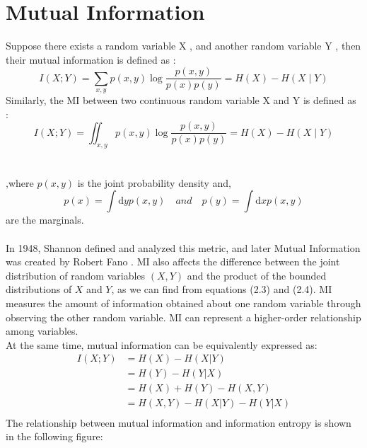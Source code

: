 \section{Mutual Information}
Suppose there exists a random variable X , and another random variable Y , then their mutual information is defined as : \cite{cover1999elements}
\begin{equation}
I(X;Y) = \sum_{x,y}p(x,y)\log{\frac{p(x,y)}{p(x)p(y)} }  = H(X) - H(X\mid Y)
\end{equation} 
Similarly, the MI between two continuous random variable X and Y is defined as : 
\begin{equation}
I(X;Y) = \iint_{x,y}p(x,y)\log{\frac{p(x,y)}{p(x)p(y)} } = H(X) - H(X\mid Y) 
\end{equation} 
\\ \hspace*{\fill} \\
,where $p(x,y)$ is the joint probability density and, 
\begin{equation}
p(x) = \int \mathrm{d}yp(x,y) \quad and \quad p(y) = \int \mathrm{d}xp(x,y)
\end{equation} 
are the marginals. \cite{carrara2020estimation}
\\ \hspace*{\fill} \\
In 1948, Shannon defined and analyzed this metric, and later Mutual Information was created by Robert Fano \cite{1057418}. MI also affects the difference between the joint distribution of random variables $(X, Y)$ and the product of the bounded distributions of $X$ and $Y$, as we can find from equations (2.3) and (2.4). MI measures the amount of information obtained about one random variable through observing the other random variable. MI can represent a higher-order relationship among variables.\\
At the same time, mutual information can be equivalently expressed as: \cite{mackay2003information}
\begin{equation}
\begin{split}
I(X;Y) &= H(X) - H(X|Y) \\
&=H(Y) - H(Y|X) \\
&=H(X) + H(Y) - H(X,Y) \\
&=H(X,Y) - H(X|Y) - H(Y|X) \\
\end{split}
\end{equation}
The relationship between mutual information and information entropy is shown in the following figure:

